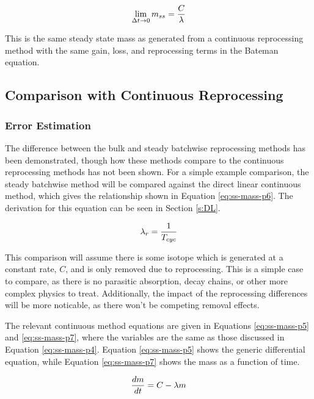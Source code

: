 \begin{equation} \hfill 
\lim_{\Delta t \to 0} m_{ss} = \frac{C}{\lambda}
\hfill\label{eq:ss-mass-limit} \end{equation}

This is the same steady state mass as generated from a continuous reprocessing method with the same gain, loss, and reprocessing terms in the Bateman equation.

\subsection{Comparison with Continuous Reprocessing}
\label{s:batch-cont-compare}

\subsubsection{Error Estimation}

The difference between the bulk and steady batchwise reprocessing methods has been demonstrated, though how these methods compare to the continuous reprocessing methods has not been shown. For a simple example comparison, the steady batchwise method will be compared against the direct linear continuous method, which gives the relationship shown in Equation \eqref{eq:ss-mass-p6}. The derivation for this equation can be seen in Section \ref{s:DL}.

\begin{equation} \hfill 
\lambda_r = \frac{1}{T_{cyc}}
\hfill\label{eq:ss-mass-p6} \end{equation}

This comparison will assume there is some isotope which is generated at a constant rate, $C$, and is only removed due to reprocessing. This is a simple case to compare, as there is no parasitic absorption, decay chains, or other more complex physics to treat. Additionally, the impact of the reprocessing differences will be more noticable, as there won't be competing removal effects.


The relevant continuous method equations are given in Equations \eqref{eq:ss-mass-p5} and \eqref{eq:ss-mass-p7}, where the variables are the same as those discussed in Equation \eqref{eq:ss-mass-p4}. Equation \eqref{eq:ss-mass-p5} shows the generic differential equation, while Equation \eqref{eq:ss-mass-p7} shows the mass as a function of time.

\begin{equation} \hfill 
\frac{dm}{dt} = C - \lambda m
\hfill\label{eq:ss-mass-p5} \end{equation}


